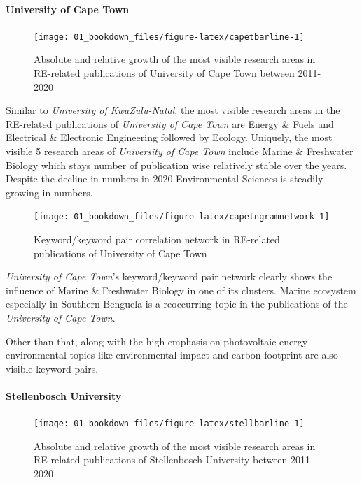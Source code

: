 \documentclass[
]{book}
\begin{document}
\hypertarget{university-of-cape-town}{%
\paragraph{University of Cape Town}\label{university-of-cape-town}}

\begin{figure}
\texttt{[image: 01\_bookdown\_files/figure-latex/capetbarline-1]} \caption{Absolute and relative growth of the most visible research areas in RE-related publications of University of Cape Town between 2011-2020}\label{fig:capetbarline}
\end{figure}

Similar to \emph{University of KwaZulu-Natal}, the most visible research areas in the RE-related publications of \emph{University of Cape Town} are Energy \& Fuels and Electrical \& Electronic Engineering followed by Ecology. Uniquely, the most visible 5 research areas of \emph{University of Cape Town} include Marine \& Freshwater Biology which stays number of publication wise relatively stable over the years. Despite the decline in numbers in 2020 Environmental Sciences is steadily growing in numbers.

\begin{figure}
\texttt{[image: 01\_bookdown\_files/figure-latex/capetngramnetwork-1]} \caption{Keyword/keyword pair correlation network in RE-related publications of University of Cape Town}\label{fig:capetngramnetwork}
\end{figure}

\emph{University of Cape Town}'s keyword/keyword pair network clearly shows the influence of Marine \& Freshwater Biology in one of its clusters. Marine ecosystem especially in Southern Benguela is a reoccurring topic in the publications of the \emph{University of Cape Town}.

Other than that, along with the high emphasis on photovoltaic energy environmental topics like environmental impact and carbon footprint are also visible keyword pairs.

\hypertarget{stellenbosch-university}{%
\paragraph{Stellenbosch University}\label{stellenbosch-university}}

\begin{figure}
\texttt{[image: 01\_bookdown\_files/figure-latex/stellbarline-1]} \caption{Absolute and relative growth of the most visible research areas in RE-related publications of Stellenbosch University between 2011-2020}\label{fig:stellbarline}
\end{figure}
\end{document}
